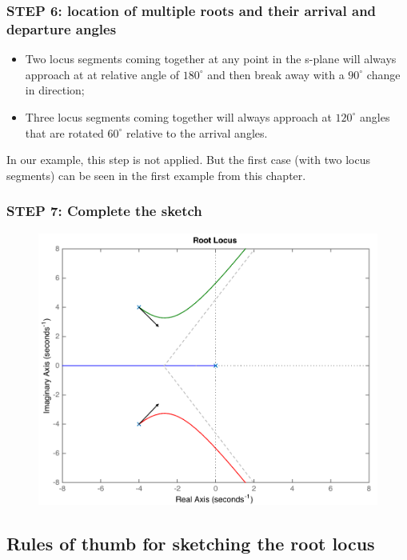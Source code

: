 \begin{frame}
\frametitle{STEP 6: location of multiple roots and their arrival and departure angles}
	\begin{itemize}
	\item Two locus segments coming together at any point in the s-plane will always approach at at relative angle of $180^{\circ}$ and then break away with a $90^{\circ}$ change in direction; 
	\item Three locus segments coming together will always approach at $120^{\circ}$ angles that are rotated $60^{\circ}$ relative to the arrival angles.
	\end{itemize}
	\begin{exampleblock}{}
		In our example, this step is not applied. But the first case (with two locus segments) can be seen in the first example from this chapter. 
	\end{exampleblock}
\end{frame}

\begin{frame}
\frametitle{STEP 7: Complete the sketch}
	\begin{exampleblock}{}	
		\begin{figure}
			\centering
			\includegraphics[width=0.7\linewidth]{how_to_draw_ex6}
		\end{figure}
	\end{exampleblock}
\end{frame}

\subsection{Rules of thumb for sketching the root locus}

